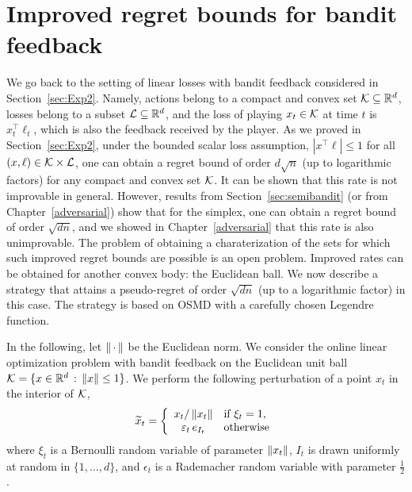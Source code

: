 \section{Improved regret bounds for bandit feedback} \label{sec:ball}
We go back to the setting of linear losses with bandit feedback considered in Section~\ref{sec:Exp2}. Namely, actions belong to a compact and convex set $\mathcal{K}\subseteq\mathbb{R}^d$, losses belong to a subset $\mathcal{L}\subseteq\mathbb{R}^d$, and the loss of playing $x_t\in\mathcal{K}$ at time $t$ is $x_t^{\top}\ell_t$, which is also the feedback received by the player. As we proved in Section~\ref{sec:Exp2}, under the bounded scalar loss assumption, $|x^{\top}\ell| \le 1$ for all $(x,\ell)\in\mathcal{K}\times\mathcal{L}$, one can obtain a regret bound of order $d \sqrt{n}$ (up to logarithmic factors) for any compact and convex set $\mathcal{K}$. It can be shown that this rate is not improvable in general. However, results from Section~\ref{sec:semibandit} (or from Chapter~\ref{adversarial}) show that for the simplex, one can obtain a regret bound of order $\sqrt{d n}$, and we showed in Chapter~\ref{adversarial} that this rate is also unimprovable. The problem of obtaining a charaterization of the sets for which such improved regret bounds are possible is an open problem. Improved rates can be obtained for another convex body: the Euclidean ball. We now describe a strategy that attains a pseudo-regret of order $\sqrt{d n}$ (up to a logarithmic factor) in this case. The strategy is based on OSMD with a carefully chosen Legendre function.

In the following, let $\left\|{\,\cdot\,}\right\|$ be the Euclidean norm. We consider the online linear optimization problem with bandit feedback on the Euclidean unit ball $\mathcal{K} = \{x \in \mathbb{R}^d \,:\, \left\|{x}\right\| \leq 1 \}$. We perform the following perturbation of a point $x_t$ in the interior of $\mathcal{K}$,
\[
    \widetilde{x}_t = \left\{ \begin{array}{cl}
        x_t / \left\|{x_t}\right\| & \text{if $\xi_t = 1$,}
    \\
        \varepsilon_t\,e_{I_t} & \text{otherwise}
    \end{array} \right.
\]
where $\xi_t$ is a Bernoulli random variable of parameter $\left\|{x_t}\right\|$, $I_t$ is drawn uniformly at random in $\{1, \hdots, d\}$, and $\epsilon_t$ is a Rademacher random variable with parameter $\frac12$.

